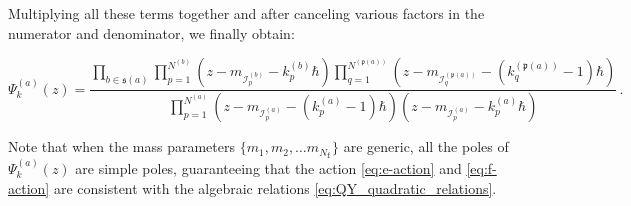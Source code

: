 \documentclass[12pt,a4paper]{article}
\renewcommand{\(}{\left(}
\renewcommand{\)}{\right)}
\renewcommand{\(}{\left(}
\renewcommand{\)}{\right)}
\begin{document}
\noindent Multiplying all these terms together and after canceling various factors in the numerator and denominator, we finally obtain:
\begin{tcolorbox}
{\small
\begin{equation}\label{eq:tree-char}
\Psi^{(a)}_k(z)=\frac{\prod_{b\in \mathfrak{s}(a)}\prod_{p=1}^{N^{(b)}}(z-m_{\mathcal{I}^{(b)}_{p}}-k^{(b)}_p\hbar)\prod_{q=1}^{N^{(\mathfrak{p}(a))}}(z-m_{\mathcal{I}^{(\mathfrak{p}(a))}_{q}}-(k^{(\mathfrak{p}(a))}_{q}-1)\hbar)}{\prod_{p=1}^{N^{(a)}}(z-m_{\mathcal{I}^{(a)}_{p}}-(k^{(a)}_{p}-1)\hbar)(z-m_{\mathcal{I}^{(a)}_{p}}-k^{(a)}_{p}\hbar)}\,.
\end{equation}}
\end{tcolorbox}
\noindent 
Note that when the mass parameters $\{m_1,m_2,\dots m_{N_{\texttt{f}}}\}$ are generic, all the poles of $\Psi^{(a)}_k(z)$ are simple poles, guaranteeing that the action \eqref{eq:e-action} and \eqref{eq:f-action} are consistent with the algebraic relations \eqref{eq:QY_quadratic_relations}.



\medskip
\end{document}
